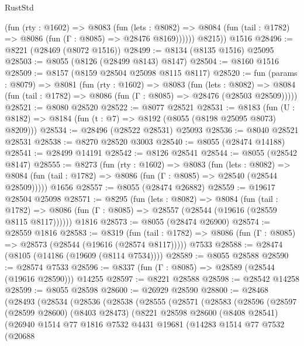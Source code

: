 \begin{lexlean}{RustStd}
\begin{coremodule}
            (fun (rty : @1602) =>
            @8083
              (fun (lets : @8082) =>
              @8084 (fun (tail : @1782) => @8086 (fun (Γ : @8085) => @28476 @8169))))))
        @8215))
    @1516
@28496 := @8221 (@28469 (@8072 @1516))
@28499 := @8134 (@8135 @1516) @25095
@28503 := @8055 (@8126 (@28499 @8143) @8147)
@28504 := @8160 @1516
@28509 := @8157 (@8159 @28504 @25098 @8115 @8117)
@28520 := fun (params : @8079) =>
  @8081
    (fun (rty : @1602) =>
    @8083
      (fun (lets : @8082) =>
      @8084 (fun (tail : @1782) => @8086 (fun (Γ : @8085) => @28476 (@28503 @28509)))))
@28521 := @8080 @28520
@28522 := @8077 @28521
@28531 := @8183
    (fun (U : @8182) => @8184 (fun (t : @7) => @8192 (@8055 (@8198 @25095 @8073) @8209)))
@28534 := @28496 (@28522 @28531) @25093
@28536 := @8040 @28521 @28531
@28538 := @8270 @28520 @3003
@28540 := @8055 (@28474 @14188)
@28541 := @28499 @14191
@28542 := @8126 @28541
@28544 := @8055 (@28542 @8147)
@28555 := @8273
    (fun (rty : @1602) =>
    @8083
      (fun (lets : @8082) =>
      @8084 (fun (tail : @1782) => @8086 (fun (Γ : @8085) => @28540 (@28544 @28509)))))
    @1656
@28557 := @8055 (@28474 @26882)
@28559 := @19617 @28504 @25098
@28571 := @8295
    (fun (lets : @8082) =>
    @8084
      (fun (tail : @1782) =>
      @8086 (fun (Γ : @8085) => @28557 (@28544 (@19616 (@28559 @8115 @8117))))))
    @1816
@28573 := @8055 (@28474 @26900)
@28574 := @28559 @1816
@28583 := @8319
    (fun (tail : @1782) => @8086 (fun (Γ : @8085) => @28573 (@28544 (@19616 (@28574 @8117)))))
    @7533
@28588 := @28474 (@8105 (@14186 (@19609 (@8114 @7534))))
@28589 := @8055 @28588
@28590 := @28574 @7533
@28596 := @8337 (fun (Γ : @8085) => @28589 (@28544 (@19616 @28590))) @14255
@28597 := @8221 @28588
@28598 := @28542 @14258
@28599 := @8055 @28598
@28600 := @26929 @28590
@28800 := @28468
    (@28493
      (@28534
        (@28536
          (@28538
            (@28555
              (@28571
                (@28583
                  (@28596
                    (@28597
                      (@28599 @28600)
                      (@8403 @28473)
                      (@8221
                        @28598
                        @28600
                        (@8408 @28541)
                        (@26940
                          @1514
                          @77
                          @1816
                          @7532
                          @4431
                          @19681
                          (@14283
                            @1514
                            @77
                            @7532
                            (@20688

\end{coremodule}
\end{lexlean}
